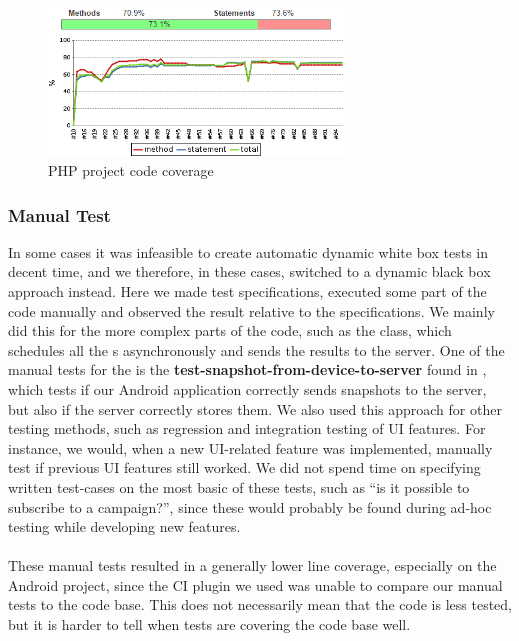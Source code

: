 \begin{figure}[!htbp]
    \centering
    \includegraphics[width=0.7\textwidth]{graphic/quality_assurance/jenkins_php_code_coverage}
    \caption{PHP project code coverage}
    \label{fig:php_project_code_coverage}
\end{figure}
\FloatBarrier

\subsubsection{Manual Test}
In some cases it was infeasible to create automatic dynamic white box tests in decent time, and we therefore, in these cases, switched to a dynamic black box approach instead. Here we made test specifications, executed some part of the code manually and observed the result relative to the specifications. We mainly did this for the more complex parts of the code, such as the  class, which schedules all the s asynchronously and sends the results to the server. One of the manual tests for the  is the \textbf{test-snapshot-from-device-to-server} found in , which tests if our Android application correctly sends snapshots to the server, but also if the server correctly stores them. We also used this approach for other testing methods, such as regression and integration testing of UI features. For instance, we would, when a new UI-related feature was implemented, manually test if previous UI features still worked. We did not spend time on specifying written test-cases on the most basic of these tests, such as ``is it possible to subscribe to a campaign?'', since these would probably be found during ad-hoc testing while developing new features.
\\\\
These manual tests resulted in a generally lower line coverage, especially on the Android project, since the CI plugin we used was unable to compare our manual tests to the code base. This does not necessarily mean that the code is less tested, but it is harder to tell when tests are covering the code base well. 

